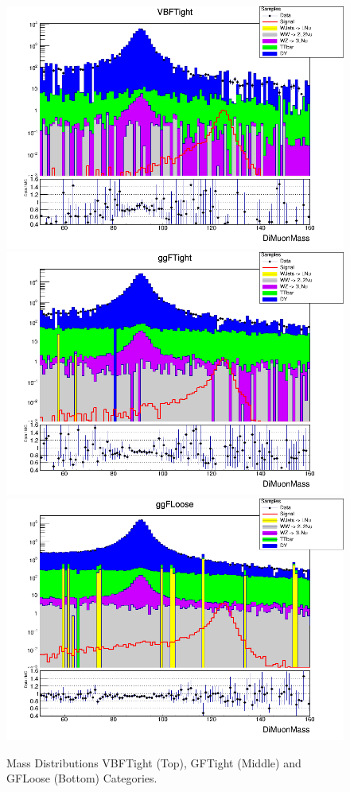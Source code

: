 \begin{figure}[H]
  \centering
  \includegraphics[width=0.65\linewidth]{figures/ch_higgs/distributions/baseline_kalman/distribution__VBFTight__DiMuonMass__logY.png}\\
  \includegraphics[width=0.65\linewidth]{figures/ch_higgs/distributions/baseline_kalman/distribution__ggFTight__DiMuonMass__logY.png}\\
  \includegraphics[width=0.65\linewidth]{figures/ch_higgs/distributions/baseline_kalman/distribution__ggFLoose__DiMuonMass__logY.png}
  \caption{Mass Distributions VBFTight (Top), GFTight (Middle) and GFLoose (Bottom) Categories.}
  \label{fig:higgs_categorization_2jetsall}
\end{figure}
